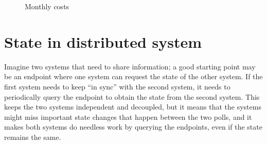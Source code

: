 \begin{figure}[h]
  \caption{Monthly costs}
  \label{plot:monthly-costs}
\end{figure}


\section{State in distributed system}
Imagine two systems that need to share information; a good starting point may be an endpoint where one system can request the state of the other system. If the first system needs to keep ``in sync'' with the second system, it needs to periodically query the endpoint to obtain the state from the second system. This keeps the two systems independent and decoupled, but it means that the systems might miss important state changes that happen between the two polls, and it makes both systems do needless work by querying the endpoints, even if the state remains the same.

